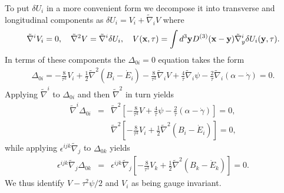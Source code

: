 To put $\delta U_i$ in a more convenient form we decompose it into transverse and longitudinal components  as $\delta U_i=V_i+\tilde{\nabla}_iV$ where 
%
\begin{eqnarray}
\tilde{\nabla}^iV_i=0,\quad \tilde{\nabla}^2V=\tilde{\nabla}^i\delta U_i,\quad V({\bf x},\tau)=\int d^3{\bf y}D^{(3)}({\bf x}-{\bf y})\tilde{\nabla}^i_y\delta U_i({\bf y}, \tau).
\label{8.14}
\end{eqnarray}
%
In terms of these components the $\Delta_{0i}=0$ equation takes the form
%
\begin{eqnarray}
\Delta_{0i}=-\frac{8}{\tau^3}V_{i}+\frac{1}{2}\tilde{\nabla}^2(B_i-\dot{E}_i)-\frac{8}{\tau^3}\tilde{\nabla}_iV+\frac{4}{\tau}\tilde{\nabla}_i\psi
-\frac{2}{\tau}\tilde{\nabla}_i(\alpha-\dot{\gamma})=0.
\label{8.15}
\end{eqnarray}
%
Applying $\tilde{\nabla}^i$ to $\Delta_{0i}$ and then $\tilde{\nabla}^2$ in turn yields
%
\begin{eqnarray}
\tilde{\nabla}^i\Delta_{0i}&=&\tilde{\nabla}^2\left[-\frac{8}{\tau^3}V+\frac{4}{\tau}\psi
-\frac{2}{\tau}(\alpha-\dot{\gamma})\right]=0,
\nonumber\\
&& \tilde{\nabla}^2\left[-\frac{8}{\tau^3}V_{i}+\frac{1}{2}\tilde{\nabla}^2(B_i-\dot{E}_i)\right]=0,\label{8.16}
\end{eqnarray}
%
while applying $\epsilon^{ijk}\tilde{\nabla}_j$ to $\Delta_{0k}$ yields
%
\begin{eqnarray}
\epsilon^{ijk}\tilde{\nabla}_j\Delta_{0k}&=&\epsilon^{ijk}\tilde{\nabla}_j\left[-\frac{8}{\tau^3}V_{k}+\frac{1}{2}\tilde{\nabla}^2(B_k-\dot{E}_k)\right]=0.
\label{8.17}
\end{eqnarray}
%
We thus identify $V-\tau^2\psi/2$ and $V_i$ as being gauge invariant.

